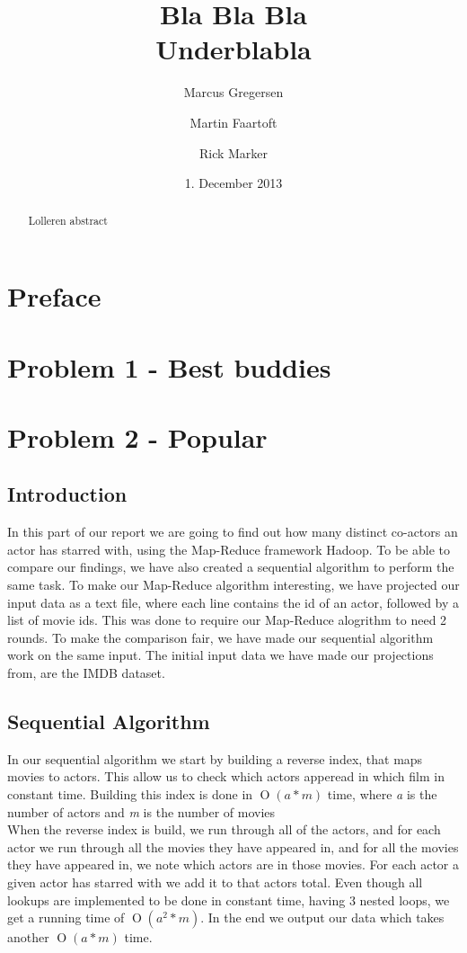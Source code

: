 \documentclass[a4paper,11pt]{article}
\newcommand{\BigO}[1]{\ensuremath{\operatorname{O}\left(#1\right)}}
\begin{document}
\date{1. December 2013}
\title{Bla Bla Bla\\Underblabla}
\author{Marcus Gregersen\and Martin Faartoft\and Rick Marker}
\clearpage\maketitle
\thispagestyle{empty}
\begin{abstract}
Lolleren abstract
\end{abstract}
\newpage
\setcounter{page}{1}
\section{Preface}
\section{Problem 1 - Best buddies}

\section{Problem 2 - Popular}
\subsection{Introduction}
In this part of our report we are going to find out how many distinct co-actors an actor has starred with, using the Map-Reduce framework Hadoop. To be able to compare our findings, we have also created a sequential algorithm to perform the same task. To make our Map-Reduce algorithm interesting, we have projected our input data as a text file, where each line contains the id of an actor, followed by a list of movie ids. This was done to require our Map-Reduce alogrithm to need 2 rounds. To make the comparison fair, we have made our sequential algorithm work on the same input. The initial input data we have made our projections from, are the IMDB dataset.
\subsection{Sequential Algorithm}
In our sequential algorithm we start by building a reverse index, that maps movies to actors. This allow us to check which actors apperead in which film in constant time. Building this index is done in \BigO{a*m} time, where \emph{a} is the number of actors and \emph{m} is the number of movies\\

When the reverse index is build, we run through all of the actors, and for each actor we run through all the movies they have appeared in, and for all the movies they have appeared in, we note which actors are in those movies. For each actor a given actor has starred with we add it to that actors total. Even though all lookups are implemented to be done in constant time,  having 3 nested loops, we get a running time of \BigO{a^2*m}. In the end we output our data which takes another \BigO{a*m} time.\\
\end{document}
